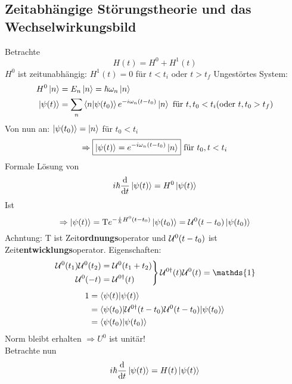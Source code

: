 	\subsection{Zeitabhängige Störungstheorie und das Wechselwirkungsbild}
	Betrachte 
		\begin{equation*}
			H(t) = H^0 + H^1 (t)
		\end{equation*}
	$H^0$ ist zeitunabhängig: $H^1(t) = 0$ für $t < t_i$ oder $t > t_f$
	Ungestörtes System: 
		\begin{align*}
			H^0 \ket{n} &= E_n \ket{n} = \hbar \omega_n \ket{n} \\
			\ket{\psi(t)} &= \sum_n \braket{n | \psi(t_0)} e^{-i \omega_n (t-t_0)} \ket{n} \text{~für~} t, t_0 < t_i (\text{oder~} t, t_0 > t_f)
		\end{align*}
	Von nun an: $\ket{\psi(t_0)} = \ket{n}$ für $t_0 < t_i$
		\begin{equation*}
			\Rightarrow \boxed{\ket{\psi (t)} = e^{-i \omega_n (t-t_0)} \ket{n}
			} \text{~für~} t_0, t < t_i
		\end{equation*}		
	Formale Lösung von 
		\begin{equation*}
			i \hbar \frac{\mathrm{d}}{\mathrm{d} t} \ket{\psi(t)}
			= H^0 \ket{\psi(t)}
		\end{equation*}			
	Ist
		\begin{equation*}
			\Rightarrow \ket{\psi(t)} = \text{T} e^{-\frac{i}{\hbar} H^0 (t-t_0)} 
			\ket{\psi(t_0)} = \mathcal{U}^0(t-t_0) \ket{\psi(t_0)}
		\end{equation*}
	Achntung: T ist Zeit\textbf{ordnungs}operator und $\mathcal{U}^0(t-t_0)$ ist Zeit\textbf{entwicklungs}operator.
	Eigenschaften:
		\begin{align*}
			\left.
			\begin{aligned}
				\U^0(t_1) \U^0(t_2) &= \U^0(t_1 + t_2) \\
				\U^0(-t) &= \U^{0\dagger} (t)		
			\end{aligned}
			\right\} \U^{0\dagger} (t) \U^0 (t) = \mathds{1}
		\end{align*}
		\begin{align*}
			1 &= \braket{\psi(t) | \psi(t)} \\
			&= \braket{\psi(t_0) | \mathcal{U}^{0 \dagger} (t-t_0) \mathcal{U}^0 (t-t_0) | \psi(t_0)} \\
			&= \braket{\psi(t_0) | \psi(t_0)}
		\end{align*}
	Norm bleibt erhalten $\Rightarrow U^0$ ist unitär! \\
	Betrachte nun 
		\begin{equation*}
			i \hbar \frac{\mathrm{d}}{\mathrm{d} t} \ket{\psi(t)} = H(t) \ket{\psi(t)}
		\end{equation*}
